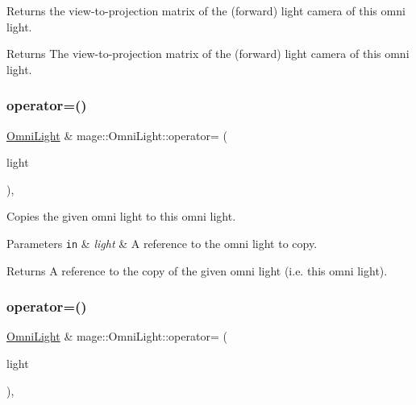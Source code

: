 Returns the view-\/to-\/projection matrix of the (forward) light camera of this omni light.

\begin{DoxyReturn}{Returns}
The view-\/to-\/projection matrix of the (forward) light camera of this omni light. 
\end{DoxyReturn}
\hypertarget{classmage_1_1_omni_light_a4c88b169df94819f394967f2e3ebf2f3}{}\label{classmage_1_1_omni_light_a4c88b169df94819f394967f2e3ebf2f3} 
\subsubsection{\texorpdfstring{operator=()}{operator=()}\hspace{0.1cm}{\footnotesize\ttfamily [1/2]}}
{\footnotesize\ttfamily \hyperlink{classmage_1_1_omni_light}{Omni\+Light} \& mage\+::\+Omni\+Light\+::operator= (\begin{DoxyParamCaption}\item[{const \hyperlink{classmage_1_1_omni_light}{Omni\+Light} \&}]{light }\end{DoxyParamCaption})\hspace{0.3cm}{\ttfamily [default]}, {\ttfamily [noexcept]}}

Copies the given omni light to this omni light.


\begin{DoxyParams}[1]{Parameters}
\mbox{\tt in}  & {\em light} & A reference to the omni light to copy. \\
\hline
\end{DoxyParams}
\begin{DoxyReturn}{Returns}
A reference to the copy of the given omni light (i.\+e. this omni light). 
\end{DoxyReturn}
\hypertarget{classmage_1_1_omni_light_a92225bb01b879ec38f193d7abbc0543e}{}\label{classmage_1_1_omni_light_a92225bb01b879ec38f193d7abbc0543e} 
\subsubsection{\texorpdfstring{operator=()}{operator=()}\hspace{0.1cm}{\footnotesize\ttfamily [2/2]}}
{\footnotesize\ttfamily \hyperlink{classmage_1_1_omni_light}{Omni\+Light} \& mage\+::\+Omni\+Light\+::operator= (\begin{DoxyParamCaption}\item[{\hyperlink{classmage_1_1_omni_light}{Omni\+Light} \&\&}]{light }\end{DoxyParamCaption})\hspace{0.3cm}{\ttfamily [default]}, {\ttfamily [noexcept]}}


